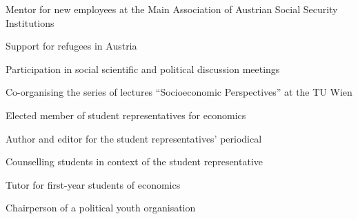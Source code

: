 

	{\begin{cvenumerate}
		\item Mentor for new employees at the Main Association of Austrian Social Security Institutions
		\item Support for refugees in Austria
		\item Participation in social scientific and political discussion meetings
	\end{cvenumerate}}

{\begin{cvenumerate}
		\item Co-organising the series of lectures ``Socioeconomic Perspectives'' at the TU Wien
		\item Elected member of student representatives for economics
		\item Author and editor for the student representatives' periodical
		\item Counselling students in context of the student representative
		\item Tutor for first-year students of economics
		\item Chairperson of a political youth organisation
	\end{cvenumerate}}